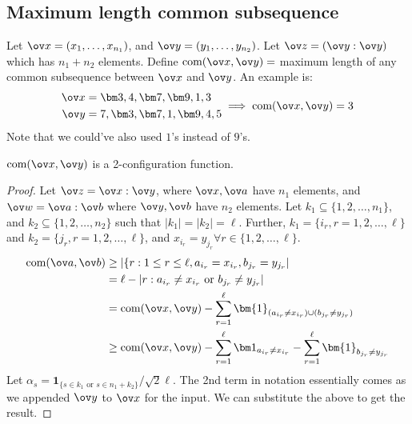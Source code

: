\subsection{Maximum length common subsequence}
\newcommand{\com}{\text{com}}
Let $\ov x = (x_1, \dots, x_{n_1})$, and $\ov y = (y_1, \dots, y_{n_2})$. Let $\ov z = (\ov y : \ov y)$ which has $n_1 + n_2 $ elements. Define $\com(\ov x, \ov y) =$ maximum length of any common subsequence between $\ov x$ and $\ov y$. An example is:
\[
\begin{split}
    \ov x &= \bm3, 4, \bm7, \bm9, 1, 3 \\
    \ov y &= 7, \bm3, \bm7, 1, \bm9, 4, 5
\end{split}
\implies \com(\ov x, \ov y) = 3
\]
Note that we could've also used $1$'s instead of $9$'s.
\begin{prop}
$\com(\ov x, \ov y)$ is a 2-configuration function.
\end{prop}
\begin{proof}
Let $\ov z = \ov x:\ov y$, where $\ov x, \ov a$ have $n_1$ elements, and $\ov w = \ov a: \ov b$ where $\ov y, \ov b$ have $n_2$ elements. Let $k_1 \subseteq \{1, 2, \dots, n_1\}$, and $k_2 \subseteq \{1, 2, \dots, n_2\}$ such that $|k_1| = |k_2| = \ell$. Further, $k_1 = \{i_r, r = 1, 2, \dots, \ell\}$ and $k_2 = \{j_r, r = 1, 2, \dots, \ell\}$, and $x_{i_r} = y_{j_r} \forall r \in \{1,2,\dots, \ell\}$.
\begin{align*}
\com(\ov a, \ov b) &\geq \left|\{r: 1\leq r\leq \ell, a_{i_r} = x_{i_r}, b_{j_r} = y_{j_r} \right| \\
&= \ell - \left|r: a_{i_r} \neq x_{i_r} \text{ or } b_{j_r} \neq y_{j_r}\right| \\
&= \com(\ov x, \ov y) - \sum_{r=1}^\ell \bm{1}_{(a_{i_r} \neq x_{i_r}) \cup (b_{j_r} \neq y_{j_r})} \\
&\geq \com(\ov x, \ov y) - \sum_{r=1}^\ell \bm1_{a_{i_r} \neq x_{i_r}} - \sum_{r=1}^\ell \bm{1}_{b_{j_r} \neq y_{j_r}}
\end{align*}
Let $\alpha_s = \bm 1_{\{s \in k_1 \text{ or } s \in n_1 + k_2\}}/{\sqrt 2\ell}$. The 2nd term in notation essentially comes as we appended $\ov y$ to $\ov x$ for the input. We can substitute the above to get the result.
\end{proof}
